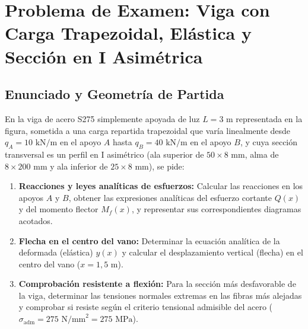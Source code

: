 \section{Problema de Examen: Viga con Carga Trapezoidal, Elástica y Sección en I Asimétrica}

\subsection{Enunciado y Geometría de Partida}

En la viga de acero S275 simplemente apoyada de luz $L = 3\text{ m}$ representada en la figura, sometida a una carga repartida trapezoidal que varía linealmente desde $q_A = 10\text{ kN/m}$ en el apoyo $A$ hasta $q_B = 40\text{ kN/m}$ en el apoyo $B$, y cuya sección transversal es un perfil en I asimétrico (ala superior de $50 \times 8\text{ mm}$, alma de $8 \times 200\text{ mm}$ y ala inferior de $25 \times 8\text{ mm}$), se pide:

\begin{enumerate}[label=\alph*)]
    \item \textbf{Reacciones y leyes analíticas de esfuerzos:} Calcular las reacciones en los apoyos $A$ y $B$, obtener las expresiones analíticas del esfuerzo cortante $Q(x)$ y del momento flector $M_f(x)$, y representar sus correspondientes diagramas acotados.
    \item \textbf{Flecha en el centro del vano:} Determinar la ecuación analítica de la deformada (elástica) $y(x)$ y calcular el desplazamiento vertical (flecha) en el centro del vano ($x = 1{,}5\text{ m}$).
    \item \textbf{Comprobación resistente a flexión:} Para la sección más desfavorable de la viga, determinar las tensiones normales extremas en las fibras más alejadas y comprobar si resiste según el criterio tensional admisible del acero ($\sigma_{\text{adm}} = 275\text{ N/mm}^2 = 275\text{ MPa}$).
\end{enumerate}

